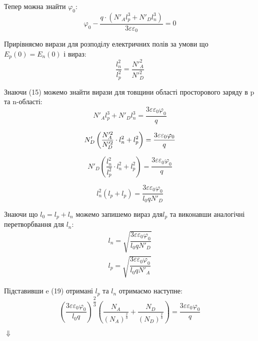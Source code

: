 \documentclass[14pt,a4paper]{scrartcl}
\begin{document}
Тепер  можна знайти $\varphi_0$:
\begin{equation}
\varphi_0-\dfrac{q\cdot(N'_Al_p^3 +N'_Dl_n^3 )}{3\varepsilon\varepsilon_0}=0
\label{eq:ref}
\end{equation}

Прирівняємо вирази для розподілу електричних полів за умови що $E_p(0)=E_n(0)$ і вираз:
\begin{equation}
\dfrac{l_n^2}{l_p^2}=\dfrac{N'^2_A}{N'^2_D}
\label{eq:ref}
\end{equation}



Знаючи (15) можемо знайти вирази для товщини області просторового заряду в p та n-області:
\begin{equation}
N'_Al_p^3 +N'_Dl_n^3= \dfrac{3\varepsilon\varepsilon_0\varphi_0}{q}
\label{eq:ref}
\end{equation}

\begin{equation}
N'_D \left(\dfrac{N'^2_A}{N'^2_D} \cdot l_n^2+l_p^2\right)= \dfrac{3\varepsilon\varepsilon_0\varphi_0}{q}\\
\end{equation}


\begin{equation}
N'_D \left(\dfrac{l_n^2}{l_p^2} \cdot l_n^2+l_p^2\right)= \dfrac{3\varepsilon\varepsilon_0\varphi_0}{q}
\end{equation}


\begin{equation}
l_n^2(l_p+l_p)= \dfrac{3\varepsilon\varepsilon_0\varphi_0}{l_0 q N'_D}
\end{equation}

Знаючи що $l_0=l_p+l_n$ можемо запишемо вираз для$l_p$ та виконавши аналогічні перетворбвання для $l_n$:
\begin{align}
l_n=\sqrt{\dfrac{3\varepsilon\varepsilon_0\varphi_0}{l_0qN'_D}}\\
l_p=\sqrt{\dfrac{3\varepsilon\varepsilon_0\varphi_0}{l_0qN'_A}}
\end{align}


Підставивши e (19) отримані  $l_p$ та $l_n$ отримаємо наступне:
\begin{equation}
\left(\dfrac{3\varepsilon\varepsilon_0\varphi_0}{l_0 q}\right)^{\dfrac{2}{3}}  \left(   \dfrac{N_A}{(N_A)^{\frac{2}{3}}} +\dfrac{N_D}{(N_D)^{\frac{2}{3}}} \right)=\dfrac{3\varepsilon\varepsilon_0\varphi_0}{q}
\end{equation}
\begin{center}
$\Downarrow$
\end{center}
\end{document}
